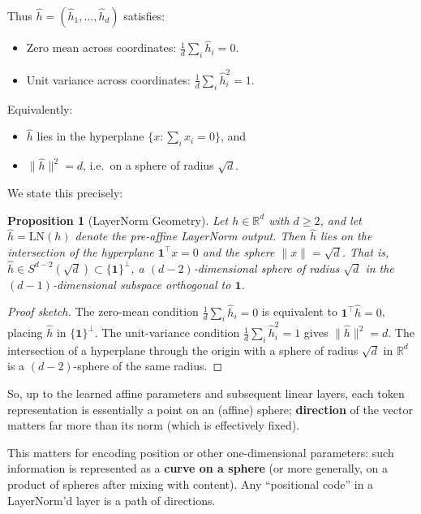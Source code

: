 \documentclass[11pt]{article}
\newtheorem{proposition}[theorem]{Proposition}
\theoremstyle{definition}
\begin{document}
Thus \(\hat{h} = (\hat{h}_1,\dots,\hat{h}_d)\) satisfies:
\begin{itemize}
    \item Zero mean across coordinates: \(\frac{1}{d} \sum_i \hat{h}_i = 0\).
    \item Unit variance across coordinates: \(\frac{1}{d} \sum_i \hat{h}_i^2 = 1\).
\end{itemize}

Equivalently:
\begin{itemize}
    \item \(\hat{h}\) lies in the hyperplane \(\{x : \sum_i x_i = 0\}\), and
    \item \(\|\hat{h}\|^2 = d\), i.e.\ on a sphere of radius \(\sqrt{d}\).
\end{itemize}

We state this precisely:

\begin{proposition}[LayerNorm Geometry]
\label{prop:ln-geometry}
Let $h \in \mathbb{R}^d$ with $d \geq 2$, and let $\hat{h} = \mathrm{LN}(h)$ denote the pre-affine LayerNorm output. Then $\hat{h}$ lies on the intersection of the hyperplane $\mathbf{1}^\top x = 0$ and the sphere $\|x\| = \sqrt{d}$. That is, $\hat{h} \in S^{d-2}(\sqrt{d}) \subset \{\mathbf{1}\}^\perp$, a $(d-2)$-dimensional sphere of radius $\sqrt{d}$ in the $(d-1)$-dimensional subspace orthogonal to $\mathbf{1}$.
\end{proposition}

\begin{proof}[Proof sketch]
The zero-mean condition $\frac{1}{d}\sum_i \hat{h}_i = 0$ is equivalent to $\mathbf{1}^\top \hat{h} = 0$, placing $\hat{h}$ in $\{\mathbf{1}\}^\perp$. The unit-variance condition $\frac{1}{d}\sum_i \hat{h}_i^2 = 1$ gives $\|\hat{h}\|^2 = d$. The intersection of a hyperplane through the origin with a sphere of radius $\sqrt{d}$ in $\mathbb{R}^d$ is a $(d-2)$-sphere of the same radius.
\end{proof}

So, up to the learned affine parameters and subsequent linear layers, each token representation is essentially a point on an (affine) sphere; \textbf{direction} of the vector matters far more than its norm (which is effectively fixed).

This matters for encoding position or other one-dimensional parameters: such information is represented as a \textbf{curve on a sphere} (or more generally, on a product of spheres after mixing with content). Any ``positional code'' in a LayerNorm'd layer is a path of directions.
\end{document}
